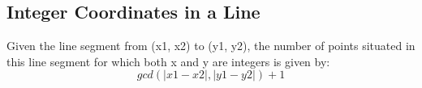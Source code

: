 \subsection{Integer Coordinates in a Line}
Given the line segment from (x1, x2) to (y1, y2), the number of points situated in this line segment for which both x and y are integers is given by:
$$ gcd(|x1 - x2|, |y1 - y2|) + 1 $$
